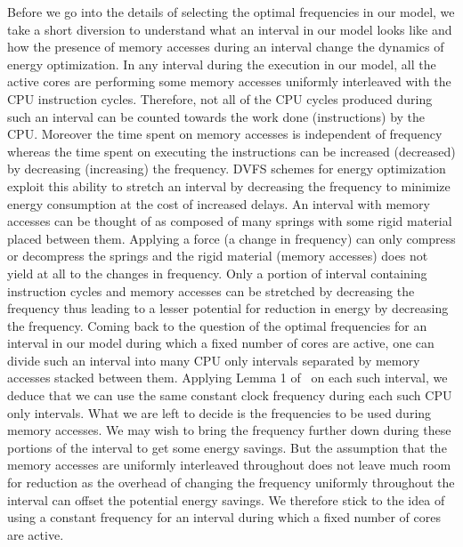 \documentclass[11pt, letterpaper]{article}
\begin{document}
Before we go into the details of selecting the optimal frequencies in our model, we take a short diversion to understand what an interval  in our model looks like and how the presence of  memory accesses during an interval change the dynamics of energy optimization. In any interval during the execution in our model, all the active cores are performing some memory accesses uniformly interleaved with the CPU instruction cycles. Therefore, not all of the CPU cycles produced during such an interval can be counted towards the work done (instructions) by the CPU. Moreover the time spent on memory accesses is independent of frequency whereas the time spent on executing the instructions can be increased (decreased) by decreasing (increasing) the frequency.  DVFS schemes for energy optimization exploit this ability to stretch an interval by decreasing the frequency to minimize energy consumption at the cost of increased delays. An interval with memory accesses can be thought of as composed of many springs with some rigid material placed between them. Applying a force (a change in frequency) can only compress or decompress the springs and the rigid material (memory accesses) does not yield at all to the changes in frequency. Only a portion of interval containing instruction cycles and memory accesses can be stretched by decreasing the frequency thus leading to a lesser potential for reduction in energy by decreasing the frequency. Coming back to the question of the optimal frequencies for an interval in our model during which a fixed number of cores are active, one can divide such an interval into many CPU only intervals separated by memory accesses stacked between them. Applying Lemma 1 of~\cite{ConvexAndScheduling} on each such interval, we deduce that we can use the same constant clock frequency during each such CPU only intervals. What we are left to decide is the frequencies to be used during memory accesses. We may wish to bring the frequency further down during these portions of the interval to get some energy savings. But the assumption that the memory accesses are uniformly interleaved throughout does not leave much room for reduction as the overhead of changing the frequency uniformly throughout the interval can offset the potential energy savings. We therefore stick to the idea of using a constant frequency for an interval during which a fixed number of cores are active.
\end{document}
